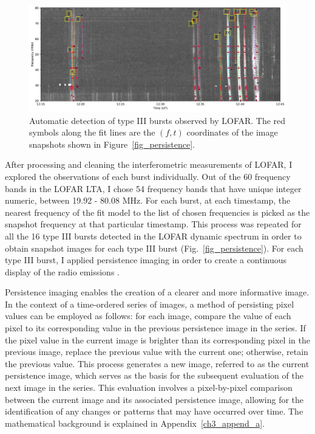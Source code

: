 \begin{figure}[!htp]
\centering
\includegraphics[width=\hsize]{chapter3/figs/lofar_dyspec_detect__snapshot_coords.pdf}
\caption{Automatic detection of type III bursts observed by LOFAR. The red symbols along the fit lines are the $(f,t)$ coordinates of the image snapshots shown in Figure~\ref{fig_persistence}.}
\label{lofar_burst_detect}
\end{figure}

After processing and cleaning the interferometric measurements of LOFAR, I explored the observations of each burst individually.
Out of the 60 frequency bands in the LOFAR LTA, I chose 54 frequency bands that have unique integer numeric, between 19.92 - 80.08 MHz.
For each burst, at each timestamp, the nearest frequency of the fit model to the list of chosen frequencies is picked as the snapshot frequency at that particular timestamp.
This process was repeated for all the 16 type III bursts detected in the LOFAR dynamic spectrum in order to obtain snapshot images for each type III burst (Fig.~\ref{fig_persistence}).
For each type III burst, I applied persistence imaging in order to create a continuous display of the radio emissions \citep{thompson_2016}.

Persistence imaging enables the creation of a clearer and more informative image.
In the context of a time-ordered series of images, a method of persisting pixel values can be employed as follows: for each image, compare the value of each pixel to its corresponding value in the previous persistence image in the series. If the pixel value in the current image is brighter than its corresponding pixel in the previous image, replace the previous value with the current one; otherwise, retain the previous value. This process generates a new image, referred to as the current persistence image, which serves as the basis for the subsequent evaluation of the next image in the series. This evaluation involves a pixel-by-pixel comparison between the current image and its associated persistence image, allowing for the identification of any changes or patterns that may have occurred over time. The mathematical background is explained in Appendix~\ref{ch3_append_a}.

